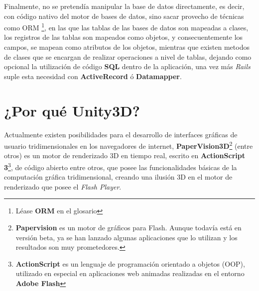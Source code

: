 Finalmente, no se pretendía manipular la base de datos directamente, es decir, con código nativo del motor de bases de datos, sino sacar provecho de técnicas como ORM \footnote{Léase \textbf{ORM} en el glosario}, en las que las tablas de las bases de datos son mapeadas a clases, los registros de las tablas son mapeados como objetos, y consecuentemente los campos, se mapean como atributos de los objetos, mientras que existen metodos de clases que se encargan de realizar operaciones a nivel de tablas, dejando como opcional la utilización de código \textbf{SQL} dentro de la aplicación, una vez más \emph{Rails} suple esta necesidad con \textbf{ActiveRecord} ó \textbf{Datamapper}.

\section{¿Por qué Unity3D?}

Actualmente existen posibilidades para el desarrollo de interfaces gráficas de usuario tridimensionales en los navegadores de internet, \textbf{PaperVision3D}\footnote{\textbf{Papervision} es un motor de gráficos para Flash. Aunque todavía está en versión beta, ya se han lanzado algunas aplicaciones que lo utilizan y los resultados son muy prometedores.} (entre otros) es un motor de renderizado 3D en tiempo real, escrito en \textbf{ActionScript 3}\footnote{\textbf{ActionScript} es un lenguaje de programación orientado a objetos (OOP), utilizado en especial en aplicaciones web animadas realizadas en el entorno \textbf{Adobe Flash}}, de código abierto entre otros, que posee las funcionalidades básicas de la computación gráfica tridimensional, creando una ilusión 3D en el motor de renderizado que posee el \emph{Flash Player}. \\

